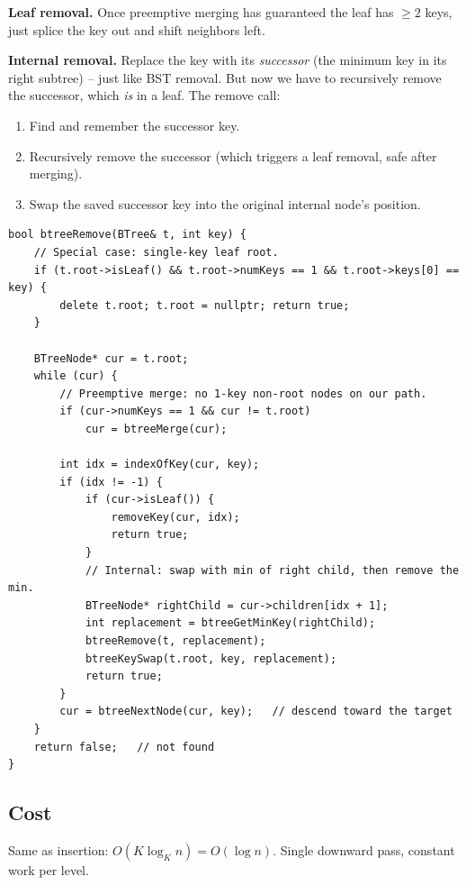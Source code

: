 \documentclass[11pt]{article}
\begin{document}
\textbf{Leaf removal.} Once preemptive merging has guaranteed the leaf has $\geq 2$ keys, just splice the key out and shift neighbors left.

\textbf{Internal removal.} Replace the key with its \emph{successor} (the minimum key in its right subtree) -- just like BST removal. But now we have to recursively remove the successor, which \emph{is} in a leaf. The remove call:

\begin{enumerate}[leftmargin=*]
    \item Find and remember the successor key.
    \item Recursively remove the successor (which triggers a leaf removal, safe after merging).
    \item Swap the saved successor key into the original internal node's position.
\end{enumerate}

\begin{lstlisting}[basicstyle=\ttfamily\small,frame=single]
bool btreeRemove(BTree& t, int key) {
    // Special case: single-key leaf root.
    if (t.root->isLeaf() && t.root->numKeys == 1 && t.root->keys[0] == key) {
        delete t.root; t.root = nullptr; return true;
    }

    BTreeNode* cur = t.root;
    while (cur) {
        // Preemptive merge: no 1-key non-root nodes on our path.
        if (cur->numKeys == 1 && cur != t.root)
            cur = btreeMerge(cur);

        int idx = indexOfKey(cur, key);
        if (idx != -1) {
            if (cur->isLeaf()) {
                removeKey(cur, idx);
                return true;
            }
            // Internal: swap with min of right child, then remove the min.
            BTreeNode* rightChild = cur->children[idx + 1];
            int replacement = btreeGetMinKey(rightChild);
            btreeRemove(t, replacement);
            btreeKeySwap(t.root, key, replacement);
            return true;
        }
        cur = btreeNextNode(cur, key);   // descend toward the target
    }
    return false;   // not found
}
\end{lstlisting}

\subsection*{Cost}

Same as insertion: $O(K \log_K n) = O(\log n)$. Single downward pass, constant work per level.
\end{document}
